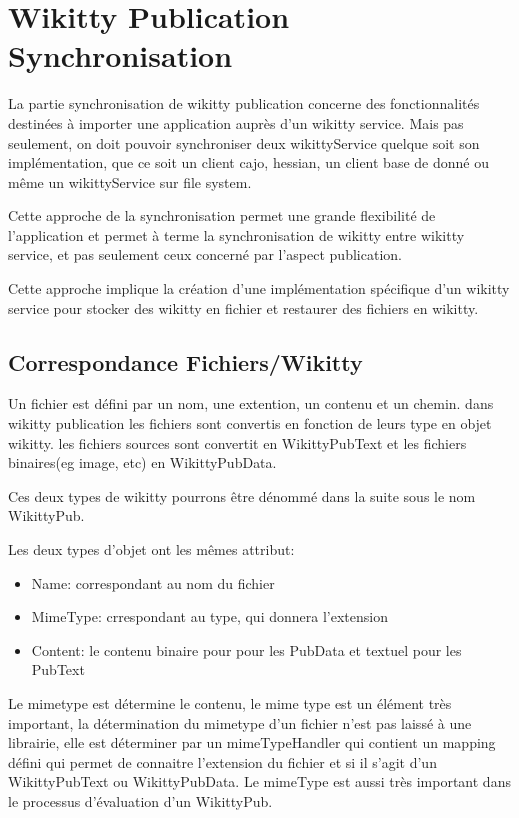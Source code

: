 \section{Wikitty Publication Synchronisation}

La partie synchronisation de wikitty publication concerne des fonctionnalités
destinées à importer une application auprès d'un wikitty service. Mais pas
seulement, on doit pouvoir synchroniser deux wikittyService quelque soit son
implémentation, que ce soit un client cajo, hessian, un client base de donné ou
même un wikittyService sur file system.

Cette approche de la synchronisation permet une grande flexibilité de
l'application et permet à terme la synchronisation de wikitty entre wikitty
service, et pas seulement ceux concerné par l'aspect publication.

Cette approche implique la création d'une implémentation spécifique d'un wikitty
service pour stocker des wikitty en fichier et restaurer des fichiers en
wikitty.


\subsection{Correspondance Fichiers/Wikitty}

Un fichier est défini par un nom, une extention, un contenu et un chemin.
dans wikitty publication les fichiers sont convertis en fonction de leurs type
en objet wikitty. les fichiers sources sont convertit en WikittyPubText et les
fichiers binaires(eg image, etc) en WikittyPubData.

Ces deux types de wikitty pourrons être dénommé dans la suite sous le nom
WikittyPub. 

Les deux types d'objet ont les mêmes attribut:
\begin{itemize}
\item Name: correspondant au nom du fichier
\item MimeType: crrespondant au type, qui donnera l'extension
\item Content: le contenu binaire pour pour les PubData et textuel pour les
PubText
\end{itemize}

Le mimetype est détermine le contenu, le mime type est un élément très important,
la détermination du mimetype d'un fichier n'est pas laissé à une librairie,
elle est déterminer par un mimeTypeHandler qui contient un mapping défini
qui permet de connaitre l'extension du fichier et si il s'agit d'un 
WikittyPubText ou WikittyPubData. Le mimeType est aussi très important dans 
le processus d'évaluation d'un WikittyPub.

